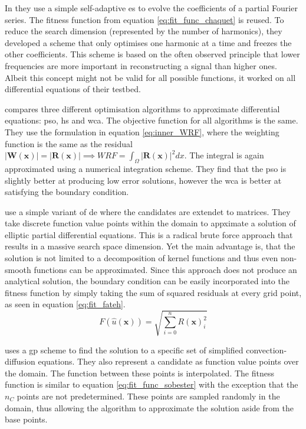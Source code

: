 \documentclass[./\jobname.tex]{subfiles}
\begin{document}
In \cite{chaquet_solving_2012} they use a simple self-adaptive \gls{es} to evolve the coefficients of a partial Fourier series. The fitness function from equation \ref{eq:fit_func_chaquet} is reused. To reduce the search dimension (represented by the number of harmonics), they developed a scheme that only optimises one harmonic at a time and freezes the other coefficients. This scheme is based on the often observed principle that lower frequencies are more important in reconstructing a signal than higher ones. Albeit this concept might not be valid for all possible functions, it worked on all differential equations of their testbed. 

\cite{sadollah_metaheuristic_2017} compares three different optimisation algorithms to approximate differential equations: \gls{pso}, \gls{hs} and \gls{wca}. The objective function for all algorithms is the same. They use the formulation in equation \ref{eq:inner_WRF}, where the weighting function is the same as the residual $|\mathbf{W}(\mathbf{x})| = |\mathbf{R}(\mathbf{x})| \implies WRF = \int_{\Omega} |\mathbf{R}(\mathbf{x})|^2 dx$. The integral is again approximated using a numerical integration scheme. They find that the \gls{pso} is slightly better at producing low error solutions, however the \gls{wca} is better at satisfying the boundary condition. 

\cite{fateh_differential_2019} use a simple variant of \gls{de} where the candidates are extendet to matrices. They take discrete function value points within the domain to appximate a solution of elliptic partial differential equations. This is a radical brute force approach that results in a massive search space dimension. Yet the main advantage is, that the solution is not limited to a decomposition of kernel functions and thus even non-smooth functions can be approximated. Since this approach does not produce an analytical solution, the boundary condition can be easily incorporated into the fitness function by simply taking the sum of squared residuals at every grid point, as seen in equation \ref{eq:fit_fateh}.
\begin{equation}
\label{eq:fit_fateh}
F(\hat{u}(\mathbf{x})) = \sqrt{\sum_{i=0}^{n} R(\mathbf{x})_i^2}
\end{equation}

\cite{howard_genetic_2011} uses a \gls{gp} scheme to find the solution to a specific set of simplified convection-diffusion equations. They also represent a candidate as function value points over the domain. The function between these points is interpolated. The fitness function is similar to equation \ref{eq:fit_func_sobester} with the exception that the $n_C$ points are not predetermined. These points are sampled randomly in the domain, thus allowing the algorithm to approximate the solution aside from the base points. 
\end{document}
